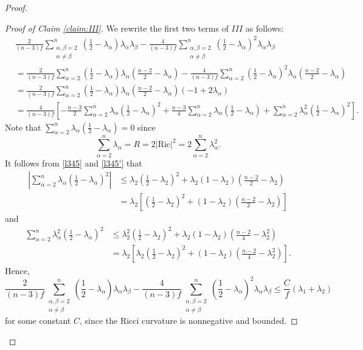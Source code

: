 \documentclass[10pt,a4paper]{amsart}
\begin{document}
\begin{proof}
	\begin{proof}[Proof of Claim \ref{claim:III}]
		We rewrite the first two terms of $III$ as follows:
		\begin{align*}
			&\frac{2}{(n-3)f}\sum_{\substack{\alpha,\beta=2 \\ \alpha\neq\beta}}^n\left(\frac{1}{2} - \lambda_{\alpha}\right)\lambda_\alpha\lambda_\beta
			- \frac{4}{(n-3)f}\sum_{\substack{\alpha,\beta=2 \\ \alpha\neq\beta}}^n\left(\frac{1}{2} - \lambda_{\alpha}\right)^2\lambda_\alpha\lambda_\beta \\
			&= \frac{2}{(n-3)f}\sum_{\alpha=2}^n\left(\frac{1}{2} - \lambda_{\alpha}\right)\lambda_\alpha\left(\frac{n-2}{2} - \lambda_\alpha\right)
			- \frac{4}{(n-3)f}\sum_{\alpha=2}^n\left(\frac{1}{2} - \lambda_{\alpha}\right)^2\lambda_\alpha\left(\frac{n-2}{2} - \lambda_\alpha\right) \\
			&= \frac{2}{(n-3)f}\sum_{\alpha=2}^n\left(\frac{1}{2} - \lambda_{\alpha}\right)\lambda_\alpha\left(\frac{n-2}{2} - \lambda_\alpha\right)(-1 + 2\lambda_{\alpha}) \\
			&= \frac{4}{(n-3)f}\left[-\frac{n-3}{2}\sum_{\alpha=2}^n\lambda_\alpha\left(\frac{1}{2} - \lambda_{\alpha}\right)^2 + \frac{n-3}{4}\sum_{\alpha=2}^n\lambda_\alpha\left(\frac{1}{2} - \lambda_{\alpha}\right) + \sum_{\alpha=2}^n\lambda_\alpha^2\left(\frac{1}{2} - \lambda_{\alpha}\right)^2\right].
		\end{align*}
		Note that $\sum_{\alpha=2}^n\lambda_\alpha\left(\frac{1}{2} - \lambda_{\alpha}\right) = 0$ since
		\[
		\sum_{\alpha=2}^n\lambda_\alpha = R = 2|\mathrm{Ric}|^2 = 2\sum_{\alpha=2}^n\lambda_\alpha^2.
		\]
		It follows from \eqref{l345} and \eqref{l345'} that
		\begin{align*}
			\left|\sum_{\alpha=2}^n\lambda_\alpha\left(\frac{1}{2} - \lambda_{\alpha}\right)^2\right|
			&\leq \lambda_2\left(\frac{1}{2} - \lambda_2\right)^2 + \lambda_2(1-\lambda_2)\left(\frac{n-2}{2} - \lambda_2\right) \\
			&= \lambda_2\left[\left(\frac{1}{2} - \lambda_2\right)^2 + (1-\lambda_2)\left(\frac{n-2}{2} - \lambda_2\right)\right]
		\end{align*}
		and
		\begin{align*}
			\sum_{\alpha=2}^n\lambda_\alpha^2\left(\frac{1}{2} - \lambda_{\alpha}\right)^2
			&\leq \lambda_2^2\left(\frac{1}{2} - \lambda_2\right)^2 + \lambda_2(1-\lambda_2)\left(\frac{n-2}{4} - \lambda_2^2\right) \\
			&= \lambda_2\left[\lambda_2\left(\frac{1}{2} - \lambda_2\right)^2 + (1-\lambda_2)\left(\frac{n-2}{4} - \lambda_2^2\right)\right].
		\end{align*}
		Hence,
		\[
		\frac{2}{(n-3)f}\sum_{\substack{\alpha,\beta=2 \\ \alpha\neq\beta}}^n\left(\frac{1}{2} - \lambda_{\alpha}\right)\lambda_\alpha\lambda_\beta
		- \frac{4}{(n-3)f}\sum_{\substack{\alpha,\beta=2 \\ \alpha\neq\beta}}^n\left(\frac{1}{2} - \lambda_{\alpha}\right)^2\lambda_\alpha\lambda_\beta
		\leq \frac{C}{f}(\lambda_{1}+\lambda_{2})
		\]
		for some constant $C$, since the Ricci curvature is nonnegative and bounded.
		

\end{proof}
\end{proof}
\end{document}
